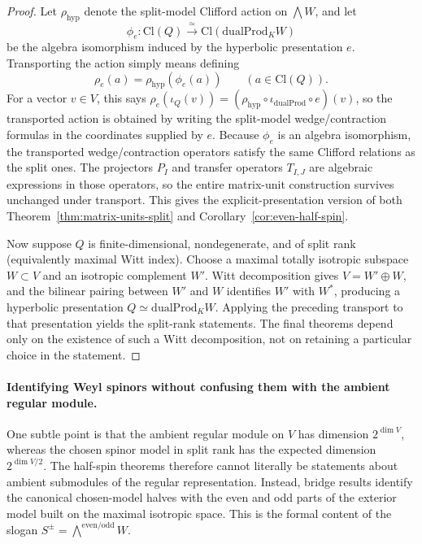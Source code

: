 \documentclass[11pt,a4paper]{article}
\theoremstyle{plain}
\theoremstyle{definition}
\theoremstyle{remark}
\newcommand{\Cl}{\mathrm{Cl}}
\newcommand{\dualProd}{\mathrm{dualProd}}
\begin{document}
\begin{proof}
Let $\rho_{\mathrm{hyp}}$ denote the split-model Clifford action on
$\bigwedge W$, and let
\[
  \phi_e:\Cl(Q)\xrightarrow{\ \simeq\ }\Cl(\dualProd_K W)
\]
be the algebra isomorphism induced by the hyperbolic presentation $e$.
Transporting the action simply means defining
\[
  \rho_e(a)=\rho_{\mathrm{hyp}}(\phi_e(a))
  \qquad (a\in \Cl(Q)).
\]
For a vector $v\in V$, this says
\(\rho_e(\iota_Q(v)) = (\rho_{\mathrm{hyp}}\circ \iota_{\dualProd}\circ e)(v)\),
so the transported action is obtained by writing the split-model
wedge/contraction formulas in the coordinates supplied by $e$.
Because $\phi_e$ is an algebra isomorphism, the transported wedge/contraction
operators satisfy the same Clifford relations as the split ones. The
projectors $P_I$ and transfer operators $T_{I,J}$ are algebraic expressions in
those operators, so the entire matrix-unit construction survives unchanged
under transport. This gives the explicit-presentation version of both
Theorem~\ref{thm:matrix-units-split} and
Corollary~\ref{cor:even-half-spin}.

Now suppose $Q$ is finite-dimensional, nondegenerate, and of split rank
(equivalently maximal Witt index). Choose a maximal totally isotropic subspace $W\subset V$ and an
isotropic complement $W'$. Witt decomposition gives
$V=W'\oplus W$, and the bilinear pairing between $W'$ and $W$ identifies
$W'$ with $W^*$, producing a hyperbolic presentation
$Q\simeq \dualProd_K W$. Applying the preceding transport to that presentation
yields the split-rank statements. The final theorems depend only on the
existence of such a Witt decomposition, not on retaining a particular choice in
the statement.
\end{proof}

\paragraph{Identifying Weyl spinors without confusing them with the ambient
regular module.}
One subtle point is that the ambient regular module on $V$ has dimension
$2^{\dim V}$, whereas the chosen spinor model in split rank has the expected
dimension $2^{\dim V/2}$. The half-spin theorems therefore cannot literally be
statements about ambient submodules of the regular representation. Instead,
bridge results identify the canonical chosen-model halves with the even and odd
parts of the exterior model built on the maximal isotropic space. This is the
formal content of the slogan
$S^{\pm} = \bigwedge^{\mathrm{even}/\mathrm{odd}} W$.
\end{document}
